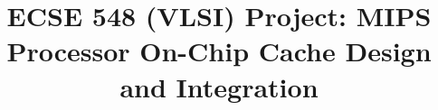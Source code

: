 \documentclass[conference]{IEEEtran}
\begin{document}
%
\title{ECSE 548 (VLSI) Project: MIPS Processor On-Chip Cache Design and Integration}




% 
\end{document}
